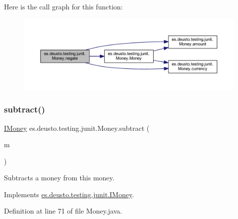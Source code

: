 Here is the call graph for this function\+:
\nopagebreak
\begin{figure}[H]
\begin{center}
\leavevmode
\includegraphics[width=350pt]{classes_1_1deusto_1_1testing_1_1junit_1_1_money_ae5f0bc3ea87f1fd55d6478653b8f2e36_cgraph}
\end{center}
\end{figure}
\mbox{\label{classes_1_1deusto_1_1testing_1_1junit_1_1_money_aada973cd1a31410ed2b7e5d2ae6bc2e9}} 
\subsubsection{\texorpdfstring{subtract()}{subtract()}}
{\footnotesize\ttfamily \mbox{\hyperlink{interfacees_1_1deusto_1_1testing_1_1junit_1_1_i_money}{I\+Money}} es.\+deusto.\+testing.\+junit.\+Money.\+subtract (\begin{DoxyParamCaption}\item[{\mbox{\hyperlink{interfacees_1_1deusto_1_1testing_1_1junit_1_1_i_money}{I\+Money}}}]{m }\end{DoxyParamCaption})}

Subtracts a money from this money. 

Implements \mbox{\hyperlink{interfacees_1_1deusto_1_1testing_1_1junit_1_1_i_money_a1fb4981aa759e3fe0679654bec7a8b61}{es.\+deusto.\+testing.\+junit.\+I\+Money}}.



Definition at line 71 of file Money.\+java.

